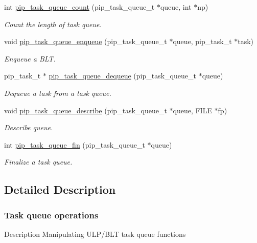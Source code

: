 \begin{DoxyCompactItemize}
int \hyperlink{group__ulp-1-task-queue_ga5a043af776eb89933bfc0a057790cc82}{pip\-\_\-task\-\_\-queue\-\_\-count} (pip\-\_\-task\-\_\-queue\-\_\-t $\ast$queue, int $\ast$np)
\begin{DoxyCompactList}\small\item\em Count the length of task queue. \end{DoxyCompactList}\item 
void \hyperlink{group__ulp-1-task-queue_gae0f80336f51c43c3da988dd0467453cf}{pip\-\_\-task\-\_\-queue\-\_\-enqueue} (pip\-\_\-task\-\_\-queue\-\_\-t $\ast$queue, pip\-\_\-task\-\_\-t $\ast$task)
\begin{DoxyCompactList}\small\item\em Enqueue a B\-L\-T. \end{DoxyCompactList}\item 
pip\-\_\-task\-\_\-t $\ast$ \hyperlink{group__ulp-1-task-queue_ga943bace202c72533951df9fc43f62277}{pip\-\_\-task\-\_\-queue\-\_\-dequeue} (pip\-\_\-task\-\_\-queue\-\_\-t $\ast$queue)
\begin{DoxyCompactList}\small\item\em Dequeue a task from a task queue. \end{DoxyCompactList}\item 
void \hyperlink{group__ulp-1-task-queue_ga7fdea4628abd0c38779276b6cd8ebd3f}{pip\-\_\-task\-\_\-queue\-\_\-describe} (pip\-\_\-task\-\_\-queue\-\_\-t $\ast$queue, F\-I\-L\-E $\ast$fp)
\begin{DoxyCompactList}\small\item\em Describe queue. \end{DoxyCompactList}\item 
int \hyperlink{group__ulp-1-task-queue_ga45d0eaa7122e459ea19187c148b9da10}{pip\-\_\-task\-\_\-queue\-\_\-fin} (pip\-\_\-task\-\_\-queue\-\_\-t $\ast$queue)
\begin{DoxyCompactList}\small\item\em Finalize a task queue. \end{DoxyCompactList}\end{DoxyCompactItemize}


\subsection{Detailed Description}
\hypertarget{ulp-task-queue}{}\subsubsection{Task queue operations}\label{ulp-task-queue}
\begin{DoxyParagraph}{Description}
Manipulating U\-L\-P/\-B\-L\-T task queue functions 
\end{DoxyParagraph}


